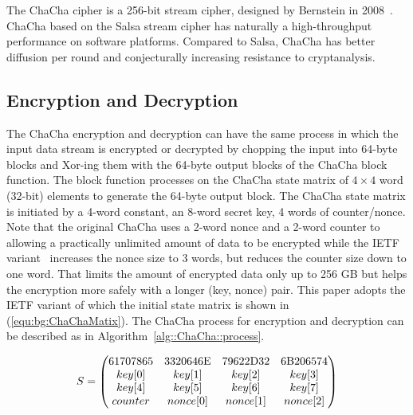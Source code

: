 The ChaCha cipher is a 256-bit stream cipher, designed by Bernstein in 2008~\cite{Ber:08}.
ChaCha based on the Salsa stream cipher has naturally a high-throughput performance on software platforms.
Compared to Salsa, ChaCha has better diffusion per round and conjecturally increasing resistance to cryptanalysis. 

\subsection{Encryption and Decryption}
The ChaCha encryption and decryption can have the same process in which the input data stream is encrypted or decrypted by chopping the input into 64-byte blocks and Xor-ing them with the 64-byte output blocks of the ChaCha block function. The block function processes on the ChaCha state matrix of $4\times4$ word (32-bit) elements to generate the 64-byte output block.
The ChaCha state matrix is initiated by a 4-word constant, an 8-word secret key, 4 words of counter/nonce. 
Note that the original ChaCha uses a 2-word nonce and a 2-word counter to allowing a practically unlimited amount of data to be encrypted while the IETF variant~\cite{RFC:18} increases the nonce size to 3 words, but reduces the counter size down to one word.
That limits the amount of encrypted data only up to 256 GB but helps the encryption more safely with a longer (key, nonce) pair. 
This paper adopts the IETF variant of which the initial state matrix is shown in (\ref{equ:bg:ChaChaMatix}). %
The ChaCha process for encryption and decryption can be described as in Algorithm~\ref{alg::ChaCha::process}.

\begin{equation}
S=
\begin{pmatrix}
$61707865$ & $3320646E$ & $79622D32$ & $6B206574$ \\
key[$0$] & key[$1$]   & key[$2$]   & key[$3$] \\
key[$4$] & key[$5$]   & key[$6$]   & key[$7$] \\
counter  & nonce[$0$] & nonce[$1$] & nonce[$2$] \\
\end{pmatrix} 
\label{equ:bg:ChaChaMatix}
\end{equation}


